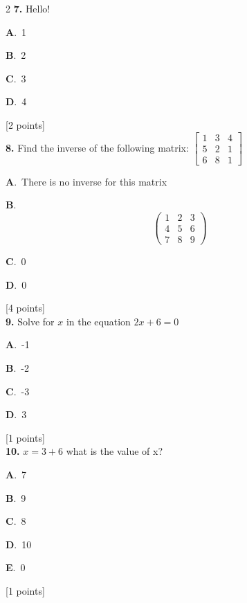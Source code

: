\documentclass[12pt]{article}
\newcommand{\choice}[3]{%
  \noindent\textbf{#1}.~#2\hfill#3\par\vspace{0.25em}
}
\begin{document}
\begin{multicols}{2}
\noindent \textbf{\textenglish{7.}} {\textenglish{Hello!}}

\noindent\choice{A}{{\textenglish{1}}}{}
\noindent\choice{B}{{\textenglish{2}}}{}
\noindent\choice{C}{{\textenglish{3}}}{}
\noindent\choice{D}{{\textenglish{4}}}{}
\hfill {\textenglish{[2 points]}}\\[0.5em]

\noindent \textbf{\textenglish{8.}} {\textenglish{Find the inverse of the following matrix: }}\(\begin{bmatrix} 1 & 3 & 4 \\ 5 & 2 & 1 \\ 6 & 8 & 1 \end{bmatrix}\)

\noindent\choice{A}{{\textenglish{There is no inverse for this matrix}}}{}
\noindent\choice{B}{\[\begin{pmatrix} 1 & 2 & 3 \\ 4 & 5 & 6 \\ 7 & 8 & 9  \end{pmatrix}\]}{}
\noindent\choice{C}{{\textenglish{0}}}{}
\noindent\choice{D}{{\textenglish{0}}}{}
\hfill {\textenglish{[4 points]}}\\[0.5em]

\noindent \textbf{\textenglish{9.}} {\textenglish{Solve for }}\(x \){\textenglish{ in the equation }}\(2x+6 = 0 \)

\noindent\choice{A}{{\textenglish{-1}}}{}
\noindent\choice{B}{{\textenglish{-2}}}{}
\noindent\choice{C}{{\textenglish{-3}}}{}
\noindent\choice{D}{{\textenglish{3}}}{}
\hfill {\textenglish{[1 points]}}\\[0.5em]

\noindent \textbf{\textenglish{10.}} \(x=3+6 \){\textenglish{ what is the value of x?}}

\noindent\choice{A}{{\textenglish{7}}}{}
\noindent\choice{B}{{\textenglish{9}}}{}
\noindent\choice{C}{{\textenglish{8}}}{}
\noindent\choice{D}{{\textenglish{10}}}{}
\noindent\choice{E}{{\textenglish{0}}}{}
\hfill {\textenglish{[1 points]}}\\[0.5em]


\end{multicols}
\end{document}
